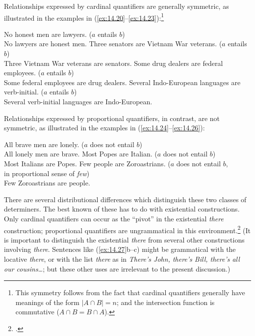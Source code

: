  
Relationships expressed by cardinal quantifiers are generally symmetric, as illustrated in the examples in (\ref{ex:14.20}--\ref{ex:14.23}):\footnote{This symmetry follows from the fact that cardinal quantifiers generally have meanings of the form $|A\cap B|=n$; and the intersection function is commutative ($A \cap  B = B \cap A$).}


\ea \label{ex:14.20}
\ea No honest men are lawyers. \hfill  ($a$ entails $b$)\\
\ex No lawyers are honest men.
 \z
\ex \label{ex:14.21}
\ea Three senators are Vietnam War veterans. \hfill  ($a$ entails $b$)\\
\ex Three Vietnam War veterans are senators.
\z 
\ex \label{ex:14.22}
\ea Some drug dealers are federal employees. \hfill  ($a$ entails $b$)\\
\ex Some federal employees are drug dealers.
\z 
\ex \label{ex:14.23}
\ea Several Indo-European languages are verb-initial. \hfill  ($a$ entails $b$)\\
\ex Several verb-initial languages are Indo-European.
\z
\z


Relationships expressed by proportional quantifiers, in contrast, are not symmetric, as illustrated in the examples in (\ref{ex:14.24}--\ref{ex:14.26}):


\ea \label{ex:14.24}
\ea All brave men are lonely. \hfill  ($a$ does not entail $b$)\\
\ex All lonely men are brave.
\z
\ex \label{ex:14.25}
\ea  Most Popes are {Italian}.  \hfill  ($a$ does not entail $b$)\\
\ex Most Italians are Popes.
\z 
\ex \label{ex:14.26}
\ea Few people are Zoroastrians.  \hfill ($a$ does not entail $b$, \\
\hfill in proportional sense of \textit{few})\\
\ex Few Zoroastrians are people.
 \z
\z


There are several distributional differences which distinguish these two classes of determiners. The best known of these has to do with existential constructions. Only cardinal quantifiers can occur as the “pivot” in the existential \textit{there} construction; proportional quantifiers are ungrammatical in this environment.\footnote{\citet{Milsark1977}.} (It is important to distinguish the existential \textit{there} from several other constructions involving \textit{there}. Sentences like (\ref{ex:14.27}b--c) might be grammatical with the locative \textit{there}, or with the list \textit{there} as in \textit{There’s John, there’s Bill, there’s all our cousins…}; but these other uses are irrelevant to the present discussion.)


